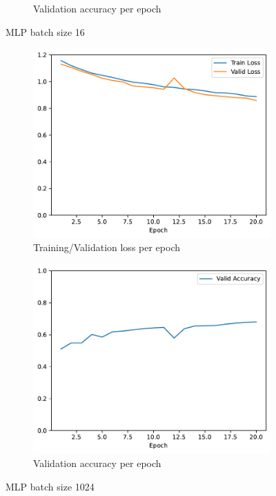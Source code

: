 \documentclass[11pt]{article}
\begin{document}
\begin{figure}[h!]
\begin{subfigure}{.5\textwidth}
  \caption{Validation accuracy per epoch}
\end{subfigure}
\caption{MLP batch size 16}
\label{fig:MLP_batch_size_16}
\end{figure}

\begin{figure}[h!]
\centering
\begin{subfigure}{.5\textwidth}
  \centering
  \includegraphics[width=.9\linewidth]{plots/mlp-training-loss-batch-1024-lr-0.1-epochs-20-hidden-200-dropout-0-l2-0-layers-1-act-relu-opt-sgd}
  \caption{Training/Validation loss per epoch}
\end{subfigure}%
\begin{subfigure}{.5\textwidth}
  \centering
  \includegraphics[width=.9\linewidth]{plots/mlp-validation-accuracy-batch-1024-lr-0.1-epochs-20-hidden-200-dropout-0-l2-0-layers-1-act-relu-opt-sgd}
  \caption{Validation accuracy per epoch}
\end{subfigure}
\caption{MLP batch size 1024}
\label{fig:MLP_batch_size_1024}
\end{figure}
\end{document}
